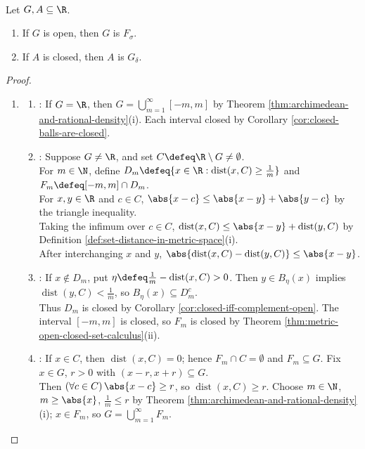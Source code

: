 \begin{proposition} \label{prop:open-real-sets-are-fsigma} \\
Let $G,A\subseteq\R$.
\begin{enumerate}[label=(\roman*)]
\setlength{\itemsep}{0pt}
\item If $G$ is open, then $G$ is $F_\sigma$.
\item If $A$ is closed, then $A$ is $G_\delta$.
\end{enumerate}
\begin{proof}
\begin{enumerate}[label=(\roman*)]
\setlength{\itemsep}{0pt}
\item
\begin{enumerate}[label=(\alph*)]
\setlength{\itemsep}{0pt}
\item {}: If $G=\R$, then $G=\bigcup\limits_{m=1}^{\infty}[-m,m]$ by Theorem \ref{thm:archimedean-and-rational-density}(i). Each interval closed by Corollary \ref{cor:closed-balls-are-closed}.
\item {}: Suppose $G\ne\R$, and set $C\defeq\R\setminus G\ne\emptyset$.\\
For $m\in\N$, define $D_m\defeq\{x\in\R:\operatorname{dist}(x,C)\geq\frac{1}{m}\}$ and $F_m\defeq[-m,m]\cap D_m$.\\
For $x,y\in\R$ and $c\in C$, $\abs{x-c}\leq\abs{x-y}+\abs{y-c}$ by the triangle inequality.\\
Taking the infimum over $c\in C$, $\operatorname{dist}(x,C)\leq\abs{x-y}+\operatorname{dist}(y,C)$ by Definition \ref{def:set-distance-in-metric-space}(i).\\
After interchanging $x$ and $y$, $\abs{\operatorname{dist}(x,C)-\operatorname{dist}(y,C)}\leq\abs{x-y}$.
\item {}: If $x\notin D_m$, put $\eta\defeq\frac{1}{m}-\operatorname{dist}(x,C)>0$. Then $y\in B_\eta(x)$ implies $\operatorname{dist}(y,C)<\frac{1}{m}$, so $B_\eta(x)\subseteq D_m^c$.\\
Thus $D_m$ is closed by Corollary \ref{cor:closed-iff-complement-open}. The interval $[-m,m]$ is closed, so $F_m$ is closed by Theorem \ref{thm:metric-open-closed-set-calculus}(ii).
\item {}: If $x\in C$, then $\operatorname{dist}(x,C)=0$; hence $F_m\cap C=\emptyset$ and $F_m\subseteq G$. Fix $x\in G$, $r>0$ with $(x-r,x+r)\subseteq G$.\\
Then $(\forall c\in C)\,\abs{x-c}\geq r$, so $\operatorname{dist}(x,C)\geq r$. Choose $m\in\N$, $m\geq\abs{x}$, $\frac{1}{m}\leq r$ by Theorem \ref{thm:archimedean-and-rational-density}(i); $x\in F_m$, so $G=\bigcup\limits_{m=1}^{\infty}F_m$.

\end{enumerate}
\end{enumerate}
\end{proof}
\end{proposition}
